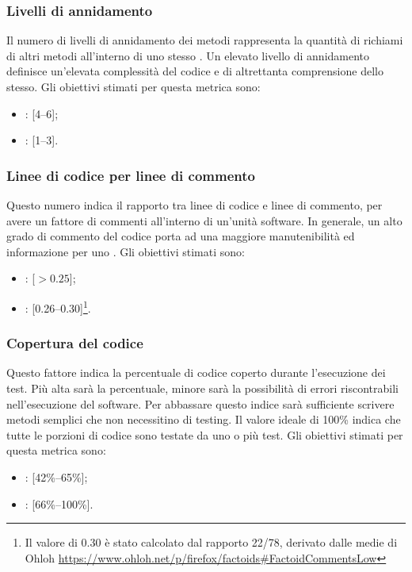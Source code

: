 \subsubsection{Livelli di annidamento}
\label{4.2.2}
Il numero di livelli di annidamento dei metodi rappresenta la quantità di richiami di altri metodi all'interno di uno stesso .
Un elevato livello di annidamento definisce un'elevata complessità del codice e di altrettanta comprensione dello stesso.
Gli obiettivi stimati per questa metrica sono:
\begin{itemize}
\item {}: [4--6];
\item {}: [1--3].
\end{itemize}

\subsubsection{Linee di codice per linee di commento}
\label{4.2.5}
Questo numero indica il rapporto tra linee di codice e linee di commento, per avere un fattore di commenti all'interno di un'unità software. In generale, un alto grado di commento del codice porta ad una maggiore manutenibilità ed informazione per uno .
Gli obiettivi stimati sono:
\begin{itemize}
\item {}: [$>0.25$];
\item {}: [0.26--0.30]\footnote{Il valore di 0.30 è stato calcolato dal rapporto 22/78, derivato dalle medie di Ohloh \url{https://www.ohloh.net/p/firefox/factoids\#FactoidCommentsLow}}.
\end{itemize}

\subsubsection{Copertura del codice}
\label{4.2.9}
Questo fattore indica la percentuale di codice coperto durante l'esecuzione dei test. Più alta sarà la percentuale, minore sarà la possibilità di errori riscontrabili nell'esecuzione del software. Per abbassare questo indice sarà sufficiente scrivere metodi semplici che non necessitino di testing. Il valore ideale di 100\% indica che tutte le porzioni di codice sono testate da uno o più test.
Gli obiettivi stimati per questa metrica sono:
\begin{itemize}
\item {}: [42\%--65\%];
\item {}: [66\%--100\%].
\end{itemize}

